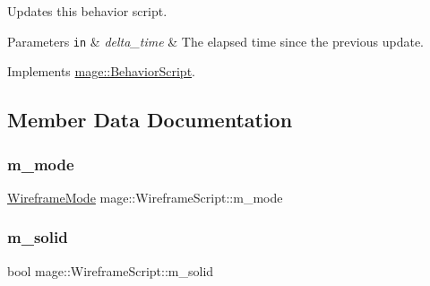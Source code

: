 Updates this behavior script.


\begin{DoxyParams}[1]{Parameters}
\mbox{\tt in}  & {\em delta\+\_\+time} & The elapsed time since the previous update. \\
\hline
\end{DoxyParams}


Implements \hyperlink{classmage_1_1_behavior_script_a905b6c83640cb91d19fecab3435f6feb}{mage\+::\+Behavior\+Script}.



\subsection{Member Data Documentation}
\hypertarget{classmage_1_1_wireframe_script_a93de9a9a8bac873b63e7529df3327ef1}{}\label{classmage_1_1_wireframe_script_a93de9a9a8bac873b63e7529df3327ef1} 
\subsubsection{\texorpdfstring{m\+\_\+mode}{m\_mode}}
{\footnotesize\ttfamily \hyperlink{classmage_1_1_wireframe_script_a99d65e77e89c2581544e68030adcefb7}{Wireframe\+Mode} mage\+::\+Wireframe\+Script\+::m\+\_\+mode\hspace{0.3cm}{\ttfamily [private]}}

\hypertarget{classmage_1_1_wireframe_script_a5e038a5e1615ab9323132a3e0a228a82}{}\label{classmage_1_1_wireframe_script_a5e038a5e1615ab9323132a3e0a228a82} 
\subsubsection{\texorpdfstring{m\+\_\+solid}{m\_solid}}
{\footnotesize\ttfamily bool mage\+::\+Wireframe\+Script\+::m\+\_\+solid\hspace{0.3cm}{\ttfamily [private]}}

